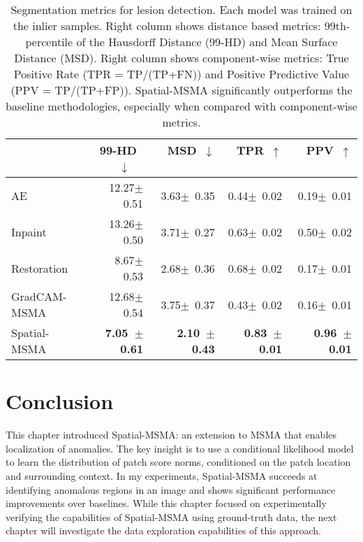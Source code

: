 \begin{table*}[!ht]
\centering
\begin{tabular}{lrr|rr}
{} &        99-HD~$\downarrow$~~&      MSD~$\downarrow$~~~~~&        TPR~$\uparrow$~~~~&             PPV~$\uparrow$~~~~~\\
\midrule
AE           &  12.27$\pm$~0.51 &  3.63$\pm$~0.35 &  0.44$\pm$~0.02 &  0.19$\pm$~0.01 \\
Inpaint      &  13.26$\pm$~0.50 &  3.71$\pm$~0.27 &  0.63$\pm$~0.02 &  0.50$\pm$~0.02 \\
Restoration  &   8.67$\pm$~0.53 &  2.68$\pm$~0.36 &  0.68$\pm$~0.02 &  0.17$\pm$~0.01 \\
GradCAM-MSMA &  12.68$\pm$~0.54 &  3.75$\pm$~0.37 &  0.43$\pm$~0.02 &  0.16$\pm$~0.01 \\
Spatial-MSMA &  \textbf{7.05~$\pm$~0.61} &  \textbf{2.10~$\pm$~0.43} &  \textbf{0.83~$\pm$~0.01} &  \textbf{0.96~$\pm$~0.01} \\
\end{tabular}

\caption{Segmentation metrics for lesion detection. Each model was trained on the inlier samples. Right column shows distance based metrics: 99th-percentile of the Hausdorff Distance (99-HD) and Mean Surface Distance (MSD). Right column shows component-wise metrics: True Positive Rate (TPR = TP/(TP+FN)) and Positive Predictive Value (PPV = TP/(TP+FP)). Spatial-MSMA significantly outperforms the baseline methodologies, especially when compared with component-wise metrics. }
\label{lesion_results}
\end{table*}

\section{Conclusion}
This chapter introduced Spatial-MSMA: an extension to MSMA that enables localization of anomalies. The key insight is to use a conditional likelihood model to learn the distribution of patch score norms, conditioned on the patch location and surrounding context. In my experiments, Spatial-MSMA succeeds at identifying anomalous regions in an image and shows significant performance improvements over baselines. While this chapter focused on experimentally verifying the capabilities of Spatial-MSMA using ground-truth data, the next chapter will investigate the data exploration capabilities of this approach.